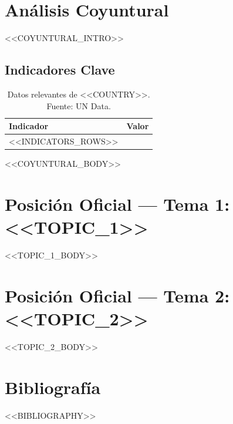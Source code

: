 \documentclass[12pt, a4paper]{article}
\begin{document}
\section{Análisis Coyuntural}

<<COYUNTURAL_INTRO>>

\subsection{Indicadores Clave}

\begin{table}[H]
\centering
\begin{tabular}{@{}ll@{}}
\toprule
\textbf{Indicador} & \textbf{Valor} \\
\midrule
<<INDICATORS_ROWS>>
\bottomrule
\end{tabular}
\caption{Datos relevantes de <<COUNTRY>>. Fuente: UN Data.}
\end{table}

<<COYUNTURAL_BODY>>

\newpage

\section{Posición Oficial --- Tema 1: <<TOPIC_1>>}

<<TOPIC_1_BODY>>

\newpage

\section{Posición Oficial --- Tema 2: <<TOPIC_2>>}

<<TOPIC_2_BODY>>

\newpage

\section{Bibliografía}

<<BIBLIOGRAPHY>>
\end{document}
